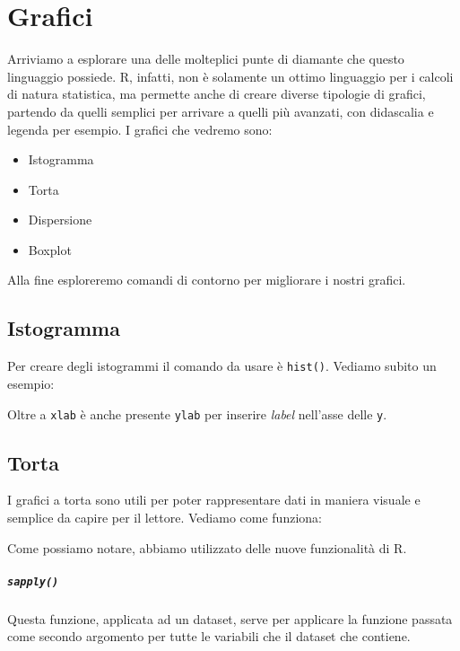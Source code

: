 \chapter{Grafici}

Arriviamo a esplorare una delle molteplici punte di diamante che questo
linguaggio possiede. R, infatti, non è solamente un ottimo linguaggio per i
calcoli di natura statistica, ma permette anche di creare diverse tipologie di
grafici, partendo da quelli semplici per arrivare a quelli più avanzati, con
didascalia e legenda per esempio.
I grafici che vedremo sono:
\begin{itemize}
 \item Istogramma
 \item Torta
 \item Dispersione
 \item Boxplot
\end{itemize}

Alla fine esploreremo comandi di contorno per migliorare i nostri grafici.

\section{Istogramma}

Per creare degli istogrammi il comando da usare è \texttt{hist()}. Vediamo
subito un esempio:



Oltre a \texttt{xlab} è anche presente \texttt{ylab} per inserire
\textit{label} nell'asse delle \texttt{y}.

\section{Torta}

I grafici a torta sono utili per poter rappresentare dati in maniera visuale e
semplice da capire per il lettore.
Vediamo come funziona:



Come possiamo notare, abbiamo utilizzato delle nuove funzionalità di R.

\paragraph*{\texttt{sapply()}} Questa funzione, applicata ad un dataset, serve
per applicare la funzione passata come secondo argomento per tutte le variabili
che il dataset che contiene.

